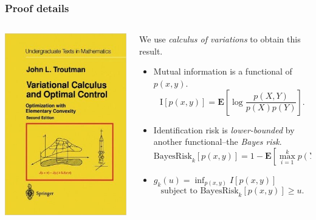 \documentclass{beamer}
\newcommand{\E}{\textbf{E}}
\begin{document}
\begin{frame}
\begin{center}
\end{center}
\end{frame}


\begin{frame}
\frametitle{Proof details}
\begin{columns}
\begin{column}{0.25\textwidth}
\includegraphics[scale = 0.27]{vcalc.jpg}
\end{column}
\begin{column}{0.75\textwidth}
We use \emph{calculus of variations} to obtain this result. \pause
\begin{itemize}
\item Mutual information is a functional of $p(x, y)$. 
\[
\text{I}[p(x, y)] = \E\left[\log \frac{p(X, Y)}{p(X)p(Y)}\right].
\]
\pause
\item Identification risk is \emph{lower-bounded} by another functional--the \emph{Bayes risk}. 
\[
\text{BayesRisk}_k[p(x, y)] = 1-\E[\max_{i=1}^k p(Y|X_i)].
\]
\pause
\item $g_k(u) = \inf_{p(x, y)} I[p(x, y)]$ \[\text{subject to BayesRisk}_k[p(x, y)] \geq u.\]
\end{itemize}
\end{column}
\end{columns}
\end{frame}
\end{document}
